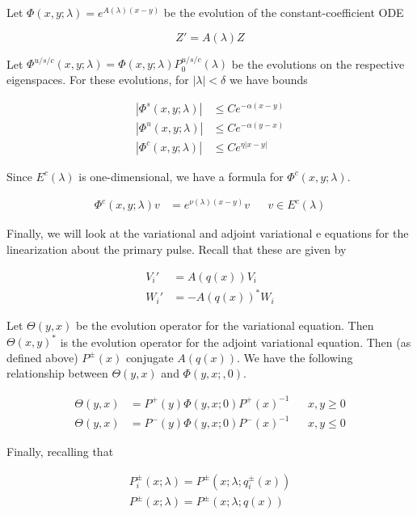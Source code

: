 \documentclass[12pt]{article}
\begin{document}
Let $\Phi(x, y; \lambda) = e^{A(\lambda)(x-y)}$ be the evolution of the constant-coefficient ODE

\[
Z' = A(\lambda) Z
\]

Let $\Phi^{u/s/c}(x, y; \lambda) = \Phi(x, y; \lambda)P^{u/s/c}_0(\lambda)$ be the evolutions on the respective eigenspaces. For these evolutions, for $|\lambda| < \delta$ we have bounds

\begin{align*}
|\Phi^s(x, y; \lambda)| &\leq C e^{-\alpha(x - y)} \\
|\Phi^u(x, y; \lambda)| &\leq C e^{-\alpha(y - x)} \\
|\Phi^c(x, y; \lambda)| &\leq C e^{\eta|x - y|} 
\end{align*}

Since $E^c(\lambda)$ is one-dimensional, we have a formula for $\Phi^c(x, y; \lambda)$.

\begin{align*}
\Phi^c(x, y; \lambda) v &= e^{\nu(\lambda)(x - y)} v && v \in E^c(\lambda)
\end{align*}

Finally, we will look at the variational and adjoint variational e
equations for the linearization about the primary pulse. Recall that these are given by 

\begin{align*}
V_i' &= A(q(x)) V_i \\
W_i' &= -A(q(x))^* W_i
\end{align*}

Let $\Theta(y, x)$ be the evolution operator for the variational equation. Then $\Theta(x, y)^*$ is the evolution operator for the adjoint variational equation. Then (as defined above) $P^\pm(x)$ conjugate $A(q(x))$. We have the following relationship between $\Theta(y, x)$ and $\Phi(y, x;, 0)$.

\begin{align*}
\Theta(y, x) &= P^+(y) \Phi(y, x; 0) P^+(x)^{-1} && x, y \geq 0 \\
\Theta(y, x) &= P^-(y) \Phi(y, x; 0) P^-(x)^{-1} && x, y \leq 0
\end{align*}

Finally, recalling that

\begin{align*}
P_i^\pm(x; \lambda) = P^\pm(x; \lambda; q_i^\pm(x)) \\
P^\pm(x; \lambda) = P^\pm(x; \lambda; q(x))
\end{align*}
\end{document}
